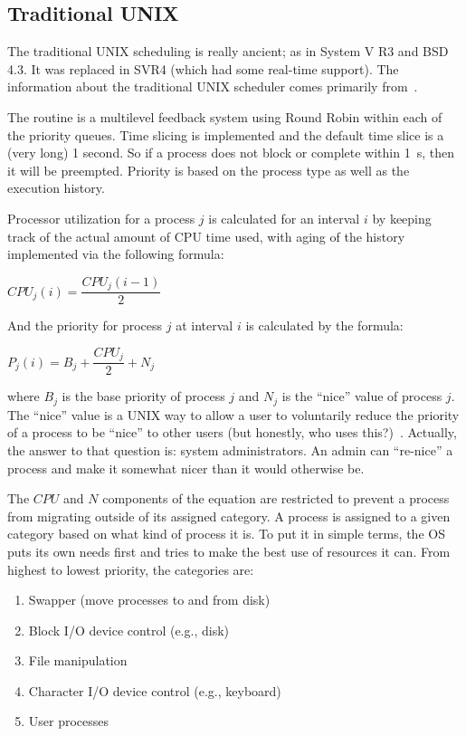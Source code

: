 \subsection*{Traditional UNIX}

The traditional UNIX scheduling is really ancient; as in System V R3 and BSD 4.3. It was replaced in SVR4 (which had some real-time support). The information about the traditional UNIX scheduler comes primarily from~\cite{osi}.

The routine is a multilevel feedback system using Round Robin within each of the priority queues. Time slicing is implemented and the default time slice is a (very long) 1 second. So if a process does not block or complete within 1~s, then it will be preempted. Priority is based on the process type as well as the execution history.

Processor utilization for a process $j$ is calculated for an interval $i$ by keeping track of the actual amount of CPU time used, with aging of the history implemented via the following formula:

\begin{center}
$CPU_{j}(i) = \dfrac{CPU_{j}(i - 1)}{2}$
\end{center}

And the priority for process $j$ at interval $i$ is calculated by the formula:

\begin{center}
$P_{j}(i) = B_{j} + \dfrac{CPU_{j}}{2} + N_{j}$
\end{center}

where $B_{j}$ is the base priority of process $j$ and $N_{j}$ is the ``nice'' value of process $j$. The ``nice'' value is a UNIX way to allow a user to voluntarily reduce the priority of a process to be ``nice'' to other users (but honestly, who uses this?)~\cite{mos}. Actually, the answer to that question is: system administrators. An admin can ``re-nice'' a process and make it somewhat nicer than it would otherwise be.

The $CPU$ and $N$ components of the equation are restricted to prevent a process from migrating outside of its assigned category. A process is assigned to a given category based on what kind of process it is. To put it in simple terms, the OS puts its own needs first and tries to make the best use of resources it can. From highest to lowest priority, the categories are:

\begin{enumerate}
	\item Swapper (move processes to and from disk)
	\item Block I/O device control (e.g., disk)
	\item File manipulation
	\item Character I/O device control (e.g., keyboard)
	\item User processes
\end{enumerate}

